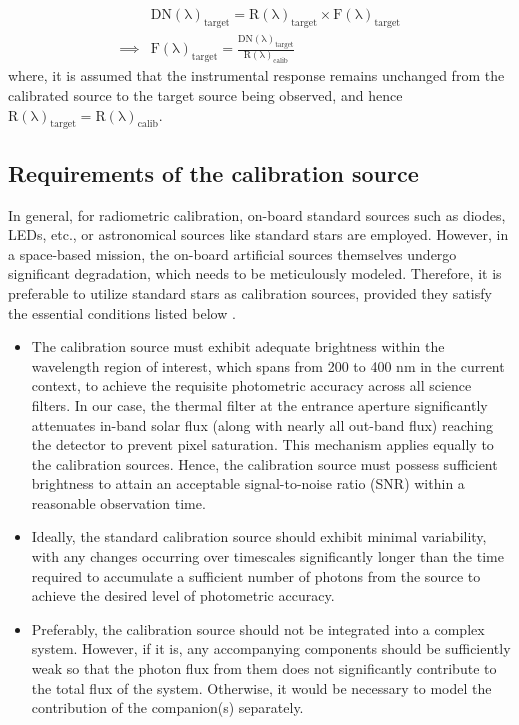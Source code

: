 \begin{align}
    &\mathrm{DN(\lambda)_{target} = R(\lambda)_{target} \times F(\lambda)_{target}} \nonumber \\
    \implies &\mathrm{F(\lambda)_{target} = \frac{DN(\lambda)_{target}}{R(\lambda)_{calib}}}
\end{align}
where, it is assumed that the instrumental response remains unchanged from the calibrated source to the target source being observed, and hence $\mathrm{R(\lambda)_{target}=R(\lambda)_{calib}}$.

\subsection{Requirements of the calibration source} \label{req}

In general, for radiometric calibration, on-board standard sources such as diodes, LEDs, etc., or astronomical sources like standard stars are employed. However, in a space-based mission, the on-board artificial sources themselves undergo significant degradation, which needs to be meticulously modeled. Therefore, it is preferable to utilize standard stars as calibration sources, provided they satisfy the essential conditions listed below \citep{article2}.

\begin{itemize}
    \item The calibration source must exhibit adequate brightness within the wavelength region of interest, which spans from 200 to 400 nm in the current context, to achieve the requisite photometric accuracy across all science filters. In our case, the thermal filter at the entrance aperture significantly attenuates in-band solar flux (along with nearly all out-band flux) reaching the detector to prevent pixel saturation. This mechanism applies equally to the calibration sources. Hence, the calibration source must possess sufficient brightness to attain an acceptable signal-to-noise ratio (SNR) within a reasonable observation time.
    \item Ideally, the standard calibration source should exhibit minimal variability, with any changes occurring over timescales significantly longer than the time required to accumulate a sufficient number of photons from the source to achieve the desired level of photometric accuracy.
    \item  Preferably, the calibration source should not be integrated into a complex system. However, if it is, any accompanying components should be sufficiently weak so that the photon flux from them does not significantly contribute to the total flux of the system. Otherwise, it would be necessary to model the contribution of the companion(s) separately.
\end{itemize}

